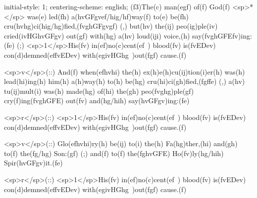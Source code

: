 initial-style: 1;
centering-scheme: english;
(f3)The(c) man(egf) of(f) God(f) <sp>*</sp> was(e) led(fh) a(hvGFgvef/hig/hf)way(f) to(e) be(fh) cru(hvhg)ci(hig/hg)fied,(fvghGFgvgf) (,) but(hv) the(ij) peo(ig)ple(iv) cried(ivHGhvGFgv) out(gf) with(hg) a(hv) loud(iji) voice,(h) say(fvghGFEfv)ing:(fe) (;) <sp>1</sp>His(fv) in(ef)no(c)cent(ef~) blood(fv) is(fvEDev) con(d)demned(effvEDev) with(egivHGhg~)out(fgf) cause.(f)

<sp>v</sp>(::) And(f) when(efhvhi) the(h) ex(h)e(h)cu(ij)tion(i)er(h) was(h) lead(hi)ing(h) him(h) a(h)way(h) to(h) be(hg) cru(hi)ci(gh)fied,(fgffe) (,) a(hv) tu(ij)mult(i) was(h) made(hg) of(hi) the(gh) peo(fvghg)ple(gf) cry(f)ing(fvghGFE) out(fv) and(hg/hih) say(hvGFgv)ing:(fe)

<sp>r</sp>(::) <sp>1</sp>His(fv) in(ef)no(c)cent(ef~) blood(fv) is(fvEDev) con(d)demned(effvEDev) with(egivHGhg~)out(fgf) cause.(f)

<sp>v</sp>(::) Glo(efhvhi)ry(h) be(ij) to(i) the(h) Fa(hg)ther,(hi) and(gh) to(f) the(fg/hg) Son:(gf) (;) and(f) to(f) the(fghvGFE) Ho(fv)ly(hg/hih) Spir(hvGFgv)it.(fe)

<sp>r</sp>(::) <sp>1</sp>His(fv) in(ef)no(c)cent(ef~) blood(fv) is(fvEDev) con(d)demned(effvEDev) with(egivHGhg~)out(fgf) cause.(f)